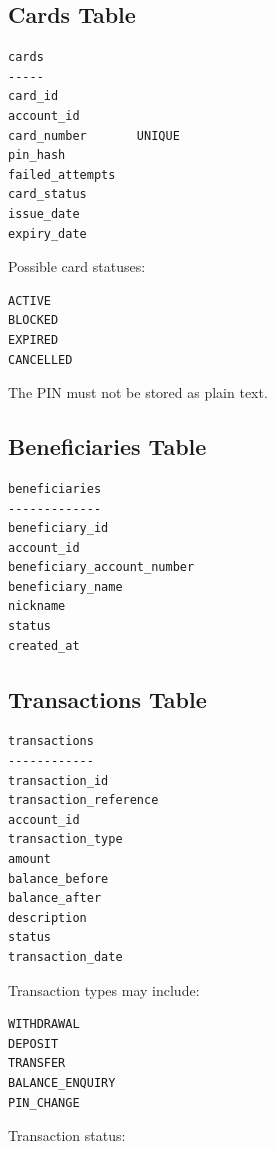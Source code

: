 \documentclass[12pt,a4paper]{article}
\begin{document}
\subsection{Cards Table}

\begin{verbatim}
cards
-----
card_id
account_id
card_number       UNIQUE
pin_hash
failed_attempts
card_status
issue_date
expiry_date
\end{verbatim}

Possible card statuses:

\begin{verbatim}
ACTIVE
BLOCKED
EXPIRED
CANCELLED
\end{verbatim}

The PIN must not be stored as plain text.


\subsection{Beneficiaries Table}

\begin{verbatim}
beneficiaries
-------------
beneficiary_id
account_id
beneficiary_account_number
beneficiary_name
nickname
status
created_at
\end{verbatim}


\subsection{Transactions Table}

\begin{verbatim}
transactions
------------
transaction_id
transaction_reference
account_id
transaction_type
amount
balance_before
balance_after
description
status
transaction_date
\end{verbatim}

Transaction types may include:

\begin{verbatim}
WITHDRAWAL
DEPOSIT
TRANSFER
BALANCE_ENQUIRY
PIN_CHANGE
\end{verbatim}

Transaction status:
\end{document}
